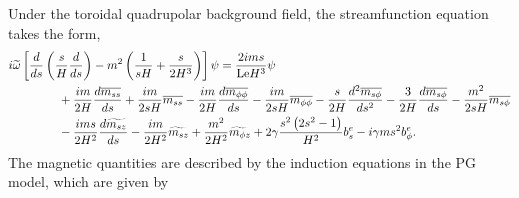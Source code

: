 Under the toroidal quadrupolar background field, the streamfunction equation takes the form,
\begin{equation}\label{eqn:eigen-pgpsi-toroidal-quadrupole}
\begin{aligned}
    i\widetilde{\omega} \left[\frac{d}{d s}\left(\frac{s}{H}\frac{d}{d s}\right) - m^2 \left(\frac{1}{sH} + \frac{s}{2H^3}\right)\right] \psi &= \frac{2 i m s}{\mathrm{Le} H^{3}} \psi \\
    &\mkern-240mu + \frac{i m}{2 H} \frac{d\overline{m_{ss}}}{d s} + \frac{i m}{2sH} \overline{m_{ss}} - \frac{i m}{2 H} \frac{d\overline{m_{\phi\phi}}}{d s} - \frac{i m}{2 sH} \overline{m_{\phi\phi}} - \frac{s}{2 H} \frac{d^{2}\overline{m_{s\phi}}}{d s^{2}} - \frac{3}{2 H} \frac{d\overline{m_{s\phi}}}{d s} - \frac{m^{2}}{2sH} \overline{m_{s\phi}} \\
    &\mkern-240mu - \frac{i m s}{2 H^{2}} \frac{d\widetilde{m_{sz}}}{d s} - \frac{i m}{2 H^{2}}\widetilde{m_{sz}} + \frac{m^{2}}{2 H^{2}}\widetilde{m_{\phi z}} + 2 \gamma \frac{s^{2} \left(2 s^{2} - 1\right)}{H^{2}} b_{s}^e - i \gamma m s^{2} b_{\phi}^e.
\end{aligned}
\end{equation}
The magnetic quantities are described by the induction equations in the PG model, which are given by
